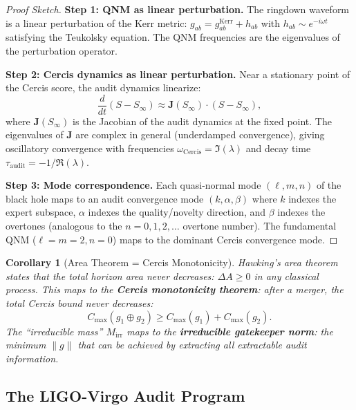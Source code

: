 \documentclass[12pt,a4paper]{article}
\newtheorem{corollary}[theorem]{Corollary}
\theoremstyle{remark}
\newcommand{\Cercis}{\textsf{Cercis}}
\begin{document}
\begin{proof}[Proof Sketch]
\noindent\textbf{Step 1: QNM as linear perturbation.}
The ringdown waveform is a linear perturbation of the Kerr metric: $g_{ab} = g_{ab}^{\text{Kerr}} + h_{ab}$ with $h_{ab} \sim e^{-i\omega t}$ satisfying the Teukolsky equation. The QNM frequencies are the eigenvalues of the perturbation operator.

\smallskip
\noindent\textbf{Step 2: Cercis dynamics as linear perturbation.}
Near a stationary point of the \Cercis{} score, the audit dynamics linearize:
\begin{equation}
  \frac{d}{dt}(S - S_{\infty}) \approx \mathbf{J}(S_{\infty}) \cdot (S - S_{\infty}),
\end{equation}
where $\mathbf{J}(S_{\infty})$ is the Jacobian of the audit dynamics at the fixed point. The eigenvalues of $\mathbf{J}$ are complex in general (underdamped convergence), giving oscillatory convergence with frequencies $\omega_{\text{Cercis}} = \Im(\lambda)$ and decay time $\tau_{\text{audit}} = -1/\Re(\lambda)$.

\smallskip
\noindent\textbf{Step 3: Mode correspondence.}
Each quasi-normal mode $(\ell, m, n)$ of the black hole maps to an audit convergence mode $(k, \alpha, \beta)$ where $k$ indexes the expert subspace, $\alpha$ indexes the quality/novelty direction, and $\beta$ indexes the overtones (analogous to the $n = 0, 1, 2, \ldots$ overtone number). The fundamental QNM ($\ell = m = 2, n = 0$) maps to the dominant Cercis convergence mode.
\end{proof}

\begin{corollary}[Area Theorem = Cercis Monotonicity]
\label{cor:area_cercis}
Hawking's area theorem~\cite{hawking1971gravitational} states that the total horizon area never decreases: $\Delta A \geq 0$ in any classical process. This maps to the \textbf{Cercis monotonicity theorem}: after a merger, the total \Cercis{} bound never decreases:
\begin{equation}
  C_{\max}(g_1 \oplus g_2) \geq C_{\max}(g_1) + C_{\max}(g_2).
\end{equation}
The ``irreducible mass'' $M_{\text{irr}}$ maps to the \textbf{irreducible gatekeeper norm}: the minimum $\|g\|$ that can be achieved by extracting all extractable audit information.
\end{corollary}

\subsection{The LIGO-Virgo Audit Program}
\end{document}
